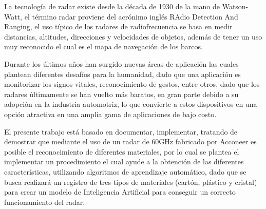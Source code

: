 
La tecnología de radar existe desde la década de 1930 de la mano de Watson-Watt, el término radar proviene del acrónimo inglés RAdio Detection And Ranging, el uso típico de los radares de radiofrecuencia se basa en medir distancias, altitudes, direcciones y velocidades de objetos, además de tener un uso muy reconocido el cual es el mapa de navegación de los barcos.

Durante los últimos años han surgido nuevas áreas de aplicación las cuales plantean diferentes desafíos para la humanidad, dado que una aplicación es monitorizar los signos vitales, reconocimiento de gestos, entre otros, dado que los radares últimamente se han vuelto más baratos, en gran parte debido a su adopción en la industria automotriz, lo que convierte a estos dispositivos en una opción atractiva en una amplia gama de aplicaciones de bajo costo.

El presente trabajo está basado en documentar, implementar, tratando de demostrar que mediante el uso de un radar de 60GHz fabricado por Acconeer es posible el reconocimiento de diferentes materiales, por lo cual se plantea el implementar un procedimiento el cual ayude a la obtención de las diferentes características, utilizando algoritmos de aprendizaje automático, dado que se busca realizará un registro de tres tipos de materiales (cartón, plástico y cristal) para crear un modelo de Inteligencia Artificial para conseguir un correcto funcionamiento del radar.
